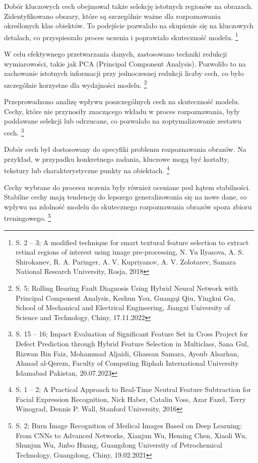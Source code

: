 \documentclass[12pt, a4paper, twoside, openany]{book}
\begin{document}
{%
Dobór kluczowych cech obejmował także selekcję istotnych regionów na obrazach.
Zidentyfikowano obszary, które są szczególnie ważne dla rozpoznawania określonych klas obiektów.
To podejście pozwalało na skupienie się na kluczowych detalach, co przyspieszało proces uczenia i poprawiało skuteczność modelu. \footnote{ S. 2 -- 3; A modified technique for smart textural feature selection to extract retinal regions of interest using image pre-processing, N. Yu Ilyasova, A. S. Shirokanev, R. A. Paringer, A. V. Kupriyanov, A. V. Zolotarev, Samara National Research University, Rosja, 2018}

W celu efektywnego przetwarzania danych, zastosowano techniki redukcji wymiarowości, takie jak PCA (Principal Component Analysis).
Pozwoliło to na zachowanie istotnych informacji przy jednoczesnej redukcji liczby cech, co było szczególnie korzystne dla wydajności modelu. \footnote{ S. 5; Rolling Bearing Fault Diagnosis Using Hybrid Neural Network with Principal Component Analysis, Keshun You, Guangqi Qiu, Yingkui Gu, School of Mechanical and Electrical Engineering, Jiangxi University of Science and Technology, Chiny, 17.11.2022}

Przeprowadzono analizę wpływu poszczególnych cech na skuteczność modelu.
Cechy, które nie przynosiły znaczącego wkładu w proces rozpoznawania, były poddawane selekcji lub odrzucane, co pozwalało na zoptymalizowanie zestawu cech. \footnote{ S. 15 -- 16; Impact Evaluation of Significant Feature Set in Cross Project for Defect Prediction through Hybrid Feature Selection in Multiclass, Sana Gul, Rizwan Bin Faiz, Mohammad Aljaidi, Ghassan Samara, Ayoub Alsarhan, Ahmad al-Qerem, Faculty of Computing Riphah International University Islamabad Pakistan, 20.07.2023}

Dobór cech był dostosowany do specyfiki problemu rozpoznawania obrazów.
Na przykład, w przypadku konkretnego zadania, kluczowe mogą być kształty, tekstury lub charakterystyczne punkty na obiektach. \footnote{ S. 1 -- 2; A Practical Approach to Real-Time Neutral Feature Subtraction for Facial Expression Recognition, Nick Haber, Catalin Voss, Azar Fazel, Terry Winograd, Dennis P. Wall, Stanford University, 2016}

Cechy wybrane do procesu uczenia były również oceniane pod kątem stabilności. Stabilne cechy mają tendencję do lepszego generalizowania się na nowe dane, co wpływa na zdolność modelu do skutecznego rozpoznawania obrazów spoza zbioru treningowego. \footnote{ S. 2; Burn Image Recognition of Medical Images Based on Deep Learning: From CNNs to Advanced Networks, Xianjun Wu, Heming Chen, Xiaoli Wu, Shunjun Wu, Jinbo Huang, Guangdong University of Petrochemical Technology, Guangdong, Chiny, 19.02.2021}

}
\end{document}
